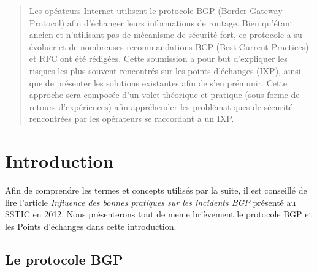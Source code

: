 



\maketitle
{}

\begin{abstract}
 Les opéateurs Internet utilisent le protocole BGP (Border Gateway Protocol) afin d'échanger leurs informations de routage. Bien qu'étant ancien et n'utilisant pas de mécanisme de sécurité fort, ce protocole a su évoluer et de nombreuses recommandations BCP (Best Current Practices) et RFC ont été rédigées.
 Cette soumission a pour but d'expliquer les risques les plus souvent rencontrés sur les points d'échanges (IXP), ainsi que de présenter les solutions existantes afin de s'en prémunir. Cette approche sera composée d'un volet théorique et pratique (sous forme de retours d'expériences) afin appréhender les problématiques de sécurité rencontrées par les opérateurs se raccordant a un IXP.
\end{abstract}


\section{Introduction}

Afin de comprendre les termes et concepts utilisés par la suite, il est conseillé de lire l'article \emph{Influence des bonnes pratiques sur les incidents BGP} \cite{fenioux:SSTIC2012} présenté au SSTIC en 2012. Nous présenterons tout de meme brièvement le protocole BGP et les Points d'échanges dans cette introduction.

\subsection{Le protocole BGP}

